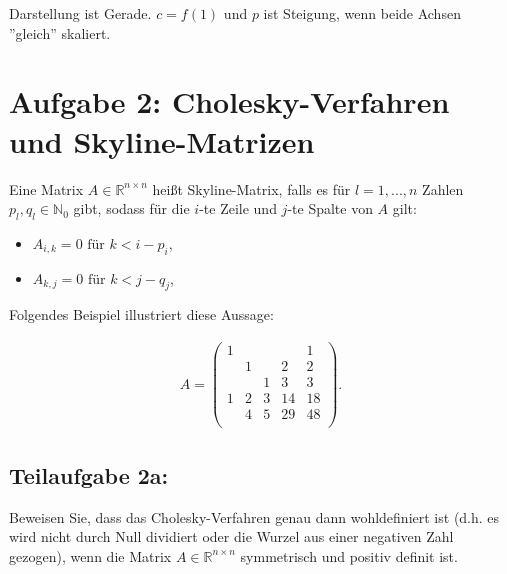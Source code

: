 \documentclass[]{article}
\begin{document}
Darstellung ist Gerade. $c = f(1)$ und $p$ ist Steigung, wenn beide Achsen ''gleich'' skaliert.

\section*{Aufgabe 2: Cholesky-Verfahren und Skyline-Matrizen}
Eine Matrix $A \in \mathbb{R}^{n\times n}$ heißt Skyline-Matrix, falls es für $l = 1, ..., n$ Zahlen $p_l, q_l \in \mathbb{N}_0$ gibt, sodass für die $i$-te Zeile und $j$-te Spalte von $A$ gilt:

\begin{itemize}
	\item $A_{i,k} = 0 \text{ für } k < i - p_i$,
	\item $A_{k,j} = 0 \text{ für } k < j - q_j$,
\end{itemize}

Folgendes Beispiel illustriert diese Aussage:

\begin{align*}
	A = \begin{pmatrix}
		1 &   &   &   & 1 \\
		  & 1 &   & 2 & 2 \\
		  &   & 1 & 3 & 3 \\
		1 & 2 & 3 &14 &18 \\
		  & 4 & 5 &29 &48 \\
	\end{pmatrix}.
\end{align*}

\subsection*{Teilaufgabe 2a:}
Beweisen Sie, dass das Cholesky-Verfahren genau dann wohldefiniert ist (d.h. es wird nicht durch Null dividiert oder die Wurzel aus einer negativen Zahl gezogen), wenn die Matrix $A \in \mathbb{R}^{n\times n}$ symmetrisch und positiv definit ist.
\end{document}
